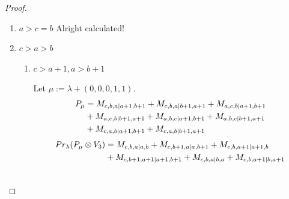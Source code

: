 \begin{proof}
\begin{enumerate}
\begin{enumerate}
\begin{table}[htbp]
\begin{tabular}{cc}
\midrule
 $P_{a+1,b+1,b+1|a+1,b+1}$ & \makecell{
 $M_{a+2,b+1,b+1|a+2,b+1}$,
 $M_{a+1,b+2,b+1|a+1,b+2}$,
 $M_{a+1,b+1,b+2|a+1,b+2}$,
 $M_{a+2,b+1,b+2|a+2,b+2}$, \\
 $M_{a+2,b+1,b+1|b+1,a+2}$,
 $M_{a+1,b+2,b+1|b+2,a+1}$,
 $M_{a+1,b+1,b+2|b+2,a+1}$,
 $M_{a+2,b+2,b+1|a+2,b+2}$, \\
 $M_{a+2,b+1,b+2|b+2,a+2}$,
 $M_{a+2,b+2,b+1|b+2,a+2}$
}\\
 & \\
 $P_{a+1,b+1,b+1|b+1,a+1}$ & \makecell{
 $M_{a+2,b+1,b+1|b+1,a+2}$,
 $M_{a+1,b+2,b+1|b+2,a+1}$,
 $M_{a+1,b+1,b+2|b+2,a+1}$,
 $M_{a+2,b+2,b+1|b+2,a+2}$, \\
 $M_{a+2,b+1,b+2|b+2,a+2}$
}\\
\bottomrule
\end{tabular}
\vspace{0.5em}
\parbox{\linewidth}{\small
\textbf{Interpretation:}
This table displays only selected computational results. This partial presentation does not affect our conclusion.
}
\end{table}
      \end{enumerate}
    \item $a>c=b$ Alright calculated!
    \item $c>a>b$
      \begin{enumerate}
        \item $c>a+1,a>b+1$ \par
        Let $\mu:=\lambda + (0,0,0,1,1) $.
        \begin{equation}\notag
          \begin{aligned}
            P_\mu &= M_{c,b,a|a+1,b+1}
+ M_{c,b,a|b+1,a+1}
+ M_{a,c,b|a+1,b+1}\\
                                              &
+ M_{a,c,b|b+1,a+1}
+ M_{a,b,c|a+1,b+1}
+ M_{a,b,c|b+1,a+1}\\
                                              &
+ M_{c,a,b|a+1,b+1}
+ M_{c,a,b|b+1,a+1}
          \end{aligned}
        \end{equation}
        \begin{equation}\notag
          \begin{aligned}
            Pr_{\lambda}(P_\mu \otimes V_{3}) &=
M_{c,b,a|a,b}
+ M_{c,b+1,a|a,b+1}
+ M_{c,b,a+1|a+1,b}\\
                                              &
+ M_{c,b+1,a+1|a+1,b+1}
+ M_{c,b,a|b,a}
+ M_{c,b,a+1|b,a+1}\\
                                              &

\end{aligned}
\end{equation}
\end{enumerate}
\end{enumerate}
\end{proof}
